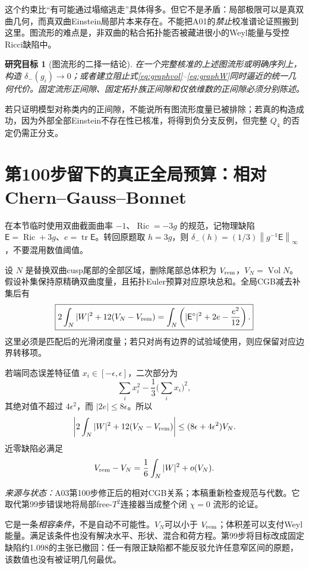 \documentclass[UTF8,a4paper,11pt,fontset=fandol]{ctexart}
\numberwithin{equation}{section}
\newtheorem{target}[theorem]{研究目标}
\theoremstyle{definition}
\newcommand{\Ric}{\operatorname{Ric}}
\newcommand{\Vol}{\operatorname{Vol}}
\newcommand{\tr}{\operatorname{tr}}
\newcommand{\norm}[1]{\left\lVert#1\right\rVert}
\newcommand{\source}[1]{\par\noindent\textit{来源与状态：}#1\par}
\begin{document}
这个约束比“有可能通过塌缩逃走”具体得多。但它不是矛盾：局部极限可以是真双曲几何，而真双曲Einstein局部片本来存在。不能把A01的\emph{禁止}校准谱论证照搬到这里。图流形的难点是，非双曲的粘合拓扑能否被藏进很小的Weyl能量与受控Ricci缺陷中。

\begin{target}[图流形的二择一结论]
在一个完整核准的上述图流形或明确序列上，构造 $\delta_-(g_i)\to0$；或者建立阻止式\eqref{eq:graphvol}--\eqref{eq:graphW}同时逼近的统一几何代价。固定流形正间隙、固定拓扑族正间隙和仅依维数的正间隙必须分别陈述。
\end{target}
若只证明模型对称类内的正间隙，不能说所有图流形度量已被排除；若真的构造成功，因为外部全部Einstein不存在性已核准，将得到负分支反例，但完整 $Q_4$ 的否定仍需正分支。

\section{第100步留下的真正全局预算：相对Chern--Gauss--Bonnet}
在本节临时使用双曲截面曲率 $-1$、$\Ric=-3g$ 的规范，记物理缺陷 $\mathsf E=\Ric+3g$、$e=\tr\mathsf E$。转回原题取 $h=3g$，则 $\delta_-(h)=(1/3)\norm{g^{-1}\mathsf E}_\infty$，不要混用数值阈值。

设 $N$ 是替换双曲cusp尾部的全部区域，删除尾部总体积为 $V_{\rm rem}$，$V_N=\Vol N$。假设补集保持原精确双曲度量，且拓扑Euler预算对应原块总和。全局CGB减去补集后有
\begin{equation}\label{eq:relative}
\boxed{
2\int_N|W|^2+12(V_N-V_{\rm rem})
=\int_N\left(|\mathsf E^\circ|^2+2e-\frac{e^2}{12}\right).}
\end{equation}
这里必须是匹配后的光滑闭度量；若只对尚有边界的试验域使用，则应保留对应边界转移项。

若端同态误差特征值 $x_i\in[-\epsilon,\epsilon]$，二次部分为
\[
\sum_i x_i^2-\frac13\Big(\sum_i x_i\Big)^2,
\]
其绝对值不超过 $4\epsilon^2$，而 $|2e|\le8\epsilon$。所以
\begin{equation}\label{eq:relativebound}
\left|2\int_N|W|^2+12(V_N-V_{\rm rem})\right|
\le(8\epsilon+4\epsilon^2)V_N.
\end{equation}
近零缺陷必满足
\[
V_{\rm rem}-V_N=\frac16\int_N|W|^2+o(V_N).
\]
\source{A03第100步修正后的相对CGB关系；本稿重新检查规范与代数。它取代第99步错误地将局部free-$T^2$连接器当成整个闭 $\chi=0$ 流形的论证。}

它是一条\emph{相容条件}，不是自动不可能性。$V_N$可以小于 $V_{\rm rem}$；体积差可以支付Weyl能量。满足该条件也没有解决水平、形状、混合和荷方程。第99步将目标改成固定缺陷约1.098的主张已撤回：任一有限正缺陷都不能反驳允许任意窄区间的原题，该数值也没有被证明几何最优。
\end{document}
